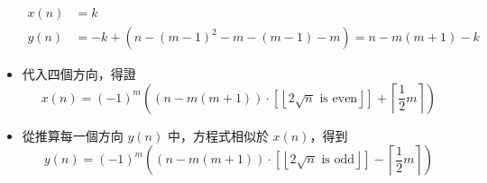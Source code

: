 \documentclass[11pt]{article}
\begin{document}
\begin{itemize}
		\begin{align*}
			x(n) &= k \\
			y(n) &= -k + (n - (m-1)^2 - m - (m-1) - m) = n - m(m+1) - k
		\end{align*}
	\item 代入四個方向，得證 $$x(n) = (-1)^m \left ( (n - m(m+1)) \cdot \left [ \left \lfloor 2 \sqrt{n} \text{ is even}\right \rfloor \right ] + \left \lceil \frac{1}{2} m \right \rceil \right )$$
	\item 從推算每一個方向 $y(n)$ 中，方程式相似於 $x(n)$，得到 $$y(n) = (-1)^m \left ( (n - m(m+1)) \cdot \left [ \left \lfloor 2 \sqrt{n} \text{ is odd}\right \rfloor \right ] - \left \lceil \frac{1}{2} m \right \rceil \right )$$
\end{itemize}
\end{document}
